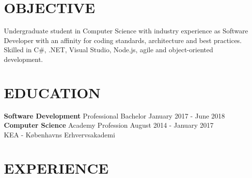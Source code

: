 \documentclass[margin, 10pt, hidelinks]{res} %
\newcommand{\emphasize}{\large\bfseries} %
\begin{document}
\begin{resume}


 \section{OBJECTIVE}

Undergraduate student in Computer Science with industry experience as Software Developer with an affinity for coding standards, 
architecture and best practices. Skilled in C\#, .NET, Visual Studio, Node.js, agile and object-oriented development.


\section{EDUCATION}

{\emphasize Software Development}  Professional Bachelor   \hfill  January 2017 - June 2018\\
{\emphasize Computer Science}  Academy Profession  \hfill  August 2014 - January 2017 \\
KEA - Københavns Erhvervsakademi 	


\section{EXPERIENCE}


\end{resume}
\end{document}
